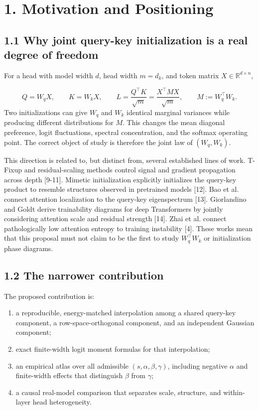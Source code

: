 \documentclass[11pt,letterpaper]{article}
\theoremstyle{definition}
\begin{document}
\section{1. Motivation and Positioning}
\subsection{1.1 Why joint query-key initialization is a real degree of freedom}
For a head with model width $d$, head width $m=d_k$, and token matrix $X\in\mathbb R^{d\times n}$,

\[
Q=W_qX,\qquad K=W_kX,\qquad
L=\frac{Q^\top K}{\sqrt m}
  =\frac{X^\top M X}{\sqrt m},\qquad M:=W_q^\top W_k.
\]
Two initializations can give $W_q$ and $W_k$ identical marginal variances while producing different distributions for $M$. This changes the mean diagonal preference, logit fluctuations, spectral concentration, and the softmax operating point. The correct object of study is therefore the joint law of $(W_q,W_k)$.

This direction is related to, but distinct from, several established lines of work. T-Fixup and residual-scaling methods control signal and gradient propagation across depth [9-11]. Mimetic initialization explicitly initializes the query-key product to resemble structures observed in pretrained models [12]. Bao et al. connect attention localization to the query-key eigenspectrum [13]. Giorlandino and Goldt derive trainability diagrams for deep Transformers by jointly considering attention scale and residual strength [14]. Zhai et al. connect pathologically low attention entropy to training instability [4]. These works mean that this proposal must not claim to be the first to study $W_q^\top W_k$ or initialization phase diagrams.

\subsection{1.2 The narrower contribution}
The proposed contribution is:

\begin{enumerate}
  \item a reproducible, energy-matched interpolation among a shared query-key component, a row-space-orthogonal component, and an independent Gaussian component;
  \item exact finite-width logit moment formulas for that interpolation;
  \item an empirical atlas over all admissible $(s,\alpha,\beta,\gamma)$, including negative $\alpha$ and finite-width effects that distinguish $\beta$ from $\gamma$;
  \item a causal real-model comparison that separates scale, structure, and within-layer head heterogeneity.
\end{enumerate}
\end{document}
